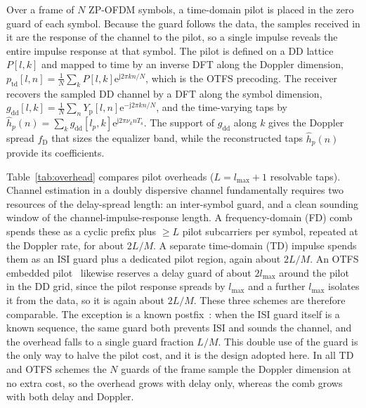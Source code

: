 \documentclass[onecolumn,journal]{IEEEtran}
\theoremstyle{bfhead}
\newcommand{\Ts}{T_{\mathrm{s}}}
\newcommand{\eu}{\mathrm{e}}
\newcommand{\jj}{\mathrm{j}}
\begin{document}
Over a frame of $N$ ZP-OFDM symbols, a time-domain pilot is placed in the zero
guard of each symbol. Because the guard follows the data, the samples received in
it are the response of the channel to the pilot, so a single impulse reveals the
entire impulse response at that symbol. The pilot is defined on a DD lattice
$P[l,k]$ and mapped to time by an inverse DFT along the Doppler dimension,
$p_{\mathrm{td}}[l,n]=\frac1N\sum_k P[l,k]\eu^{\jj2\pi kn/N}$, which is the OTFS
precoding. The receiver recovers the sampled DD channel by a DFT along the symbol
dimension,
$g_{\mathrm{dd}}[l,k]=\frac1N\sum_n Y_{\mathrm p}[l,n]\eu^{-\jj2\pi kn/N}$, and the
time-varying taps by
$\hat h_p(n)=\sum_k g_{\mathrm{dd}}[l_p,k]\eu^{\jj2\pi\nu_k n\Ts}$. The support of
$g_{\mathrm{dd}}$ along $k$ gives the Doppler spread $f_{\mathrm D}$ that sizes the
equalizer band, while the reconstructed taps $\hat h_p(n)$ provide its
coefficients.

Table~\ref{tab:overhead} compares pilot overheads ($L=l_{\max}+1$ resolvable
taps). Channel estimation in a doubly dispersive channel fundamentally requires
two resources of the delay-spread length: an inter-symbol guard, and a clean
sounding window of the channel-impulse-response length. A frequency-domain (FD)
comb spends these as a cyclic prefix plus $\ge L$ pilot subcarriers per symbol,
repeated at the Doppler rate, for about $2L/M$. A separate time-domain (TD)
impulse spends them as an ISI guard plus a dedicated pilot region, again about
$2L/M$. An OTFS embedded pilot~\cite{Raviteja2019} likewise reserves a delay
guard of about $2l_{\max}$ around the pilot in the DD grid, since the pilot
response spreads by $l_{\max}$ and a further $l_{\max}$ isolates it from the data,
so it is again about $2L/M$. These three schemes are therefore comparable. The
exception is a known postfix~\cite{Muck2006}: when the ISI guard itself is a known
sequence, the same guard both prevents ISI and sounds the channel, and the
overhead falls to a single guard fraction $L/M$. This double use of the guard is
the only way to halve the pilot cost, and it is the design adopted here. In all
TD and OTFS schemes the $N$ guards of the frame sample the Doppler dimension at no
extra cost, so the overhead grows with delay only, whereas the comb grows with
both delay and Doppler.
\end{document}
